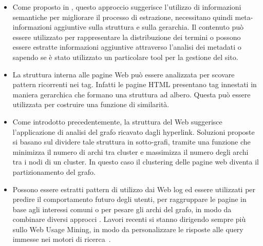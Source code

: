 \begin{itemize}

\item Come proposto in \cite{Cooley03}, questo approccio suggerisce l'utilizzo di informazioni semantiche per migliorare il processo di estrazione, necessitano quindi meta-informazioni aggiuntive sulla struttura e sulla gerarchia. Il contenuto può essere utilizzato per rappresentare la distribuzione dei termini o possono essere estratte informazioni aggiuntive attraverso l'analisi dei metadati o sapendo se è stato utilizzato un particolare tool per la gestione del sito.

\item La struttura interna alle pagine Web può essere analizzata per scovare pattern ricorrenti nei tag. Infatti le pagine HTML presentano tag innestati in maniera gerarchica che formano una struttura ad albero. Questa può essere utilizzata per costruire una funzione di similarità. 

\item Come introdotto precedentemente, la struttura del Web suggerisce l'applicazione di analisi del grafo ricavato dagli hyperlink. Soluzioni proposte \cite{Luxburg07} si basano sul dividere tale struttura in sotto-grafi, tramite una funzione che minimizza il numero di archi tra cluster e massimizza il numero degli archi tra i nodi di un cluster. In questo caso il clustering delle pagine web diventa il partizionamento del grafo. 

\item Possono essere estratti pattern di utilizzo dai Web log ed essere utilizzati per predire il comportamento futuro degli utenti, per raggruppare le pagine in base agli interessi comuni o per pesare gli archi del grafo, in modo da combinare diversi approcci \cite{Shahabi97}. Lavori recenti si stanno dirigendo sempre più sullo Web Usage Mining, in modo da personalizzare le risposte alle query immesse nei motori di ricerca~\cite{Crabtree06}.
\end{itemize}

